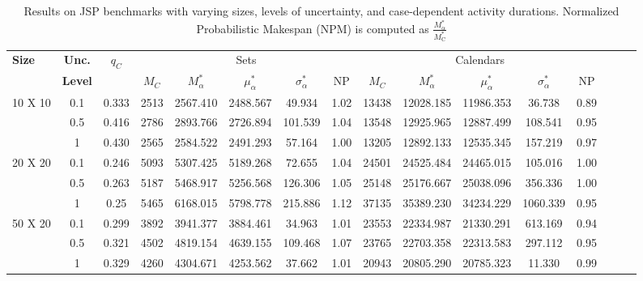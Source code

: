 \begin{table}[h]
\centering
\begin{tabular}{l@{\hskip 0.05in}c@{\hskip 0.05in}c@{\hskip 0.07in}c@{\hskip 0.05in}c@{\hskip 0.05in}c@{\hskip 0.05in}c@{\hskip 0.05in}c@{\hskip 0.05in}c@{\hskip 0.05in}c@{\hskip 0.05in}c@{\hskip 0.04in}c@{\hskip 0.05in}c@{\hskip 0.05in}c@{\hskip 0.05in}c@{\hskip 0.05in}c@{\hskip 0.04in}}
\toprule
\textbf{Size} & \textbf{Unc.} & \textbf{$q_{C}$} & \multicolumn{5}{c}{Sets} & \multicolumn{5}{c}{Calendars} &
 \\
& \textbf{Level} & & $M_{C}$ & $M^*_{\alpha}$ & $\mu^*_{\alpha}$ & $\sigma^*_{\alpha}$ & NP & $M_{C}$ & $M^*_{\alpha}$ & $\mu^*_{\alpha}$ & $\sigma^*_{\alpha}$ &  NP \\
\midrule
  \multirow{3}{*}{10 X 10} & 0.1 &  0.333 & 2513 & 2567.410 & 2488.567 & 49.934 & 1.02 & 13438 & 12028.185 & 11986.353 & 36.738 & 0.89\\
  & 0.5 & 0.416 & 2786 & 2893.766 & 2726.894 & 101.539 & 1.04 & 13548 & 12925.965 & 12887.499 & 108.541 & 0.95 \\
  & 1 & 0.430 & 2565 & 2584.522 & 2491.293 & 57.164 & 1.00 & 13205 & 12892.133 & 12535.345 & 157.219 & 0.97\\
  \midrule
  
 \multirow{3}{*}{20 X 20} & 0.1 &  0.246 & 5093 & 5307.425 & 5189.268 & 72.655 & 1.04 & 24501 & 24525.484 & 24465.015 & 105.016 & 1.00 \\
  & 0.5 & 0.263 & 5187 & 5468.917 & 5256.568 & 126.306  & 1.05 & 25148 & 25176.667 & 25038.096 & 356.336 & 1.00\\
  & 1 & 0.25 & 5465 & 6168.015 & 5798.778 & 215.886 & 1.12 & 37135 & 35389.230 & 34234.229 & 1060.339 & 0.95 \\
  \midrule

\multirow{3}{*}{50 X 20} & 0.1 & 0.299 & 3892 & 3941.377 & 3884.461 & 34.963 & 1.01 & 23553 & 22334.987 & 21330.291 & 613.169 & 0.94 \\
  & 0.5 & 0.321 & 4502 & 4819.154 & 4639.155 & 109.468 & 1.07 & 23765 & 22703.358 & 22313.583 & 297.112 & 0.95\\
  & 1 & 0.329 & 4260 & 4304.671 & 4253.562 & 37.662 & 1.01 & 20943 & 20805.290 & 20785.323 & 11.330 & 0.99 \\
  
  \bottomrule
\end{tabular}
\caption{Results on JSP benchmarks with varying sizes, levels of uncertainty, and case-dependent activity durations. Normalized Probabilistic Makespan (NPM) is computed as \( \frac{M^*_\alpha}{M^*_{\text{C}}} \)}
\label{tab:resultSynthetic_prediction_appendix}
\end{table}

